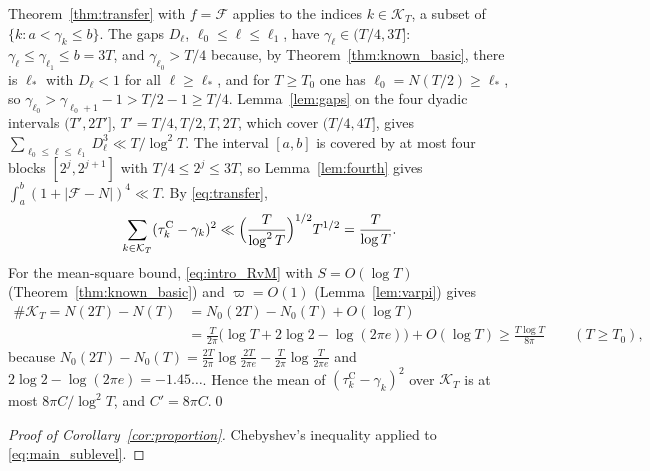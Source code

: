 \documentclass[11pt,a4paper]{article}
\makeatletter
\numberwithin{equation}{section}
\DeclareRobustCommand{\CGref}[1]{\ref{#1}}
\DeclareRobustCommand{\CGeqref}[1]{\eqref{#1}}
\let\CG@origref\ref
\let\CG@origeqref\eqref
\newcommand{\CG@gettip}[1]{\@ifundefined{CGTip@#1}{#1}{\csname CGTip@#1\endcsname}}
\DeclareRobustCommand{\CGref}[1]{\pdftooltip{\CG@origref{#1}}{\CG@gettip{#1}}}
\DeclareRobustCommand{\CGeqref}[1]{\pdftooltip{\CG@origeqref{#1}}{\CG@gettip{#1}}}
\theoremstyle{definition}
\theoremstyle{remark}
\newcommand{\Nz}{N_0} %
\newcommand{\Fc}{\mathcal F}
\newcommand{\Kc}{\mathcal K}
\makeatother
\begin{document}
Theorem~\CGref{thm:transfer} with $f=\Fc$ applies to the indices $k\in\Kc_T$, a subset of $\{k:a<\gamma_k\le b\}$. The gaps $D_\ell$, $\ell_0\le\ell\le\ell_1$, have $\gamma_\ell\in(T/4,3T]$: $\gamma_\ell\le\gamma_{\ell_1}\le b=3T$, and $\gamma_{\ell_0}>T/4$ because, by Theorem~\CGref{thm:known_basic}, there is $\ell_*$ with $D_\ell<1$ for all $\ell\ge\ell_*$, and for $T\ge T_0$ one has $\ell_0=N(T/2)\ge\ell_*$, so $\gamma_{\ell_0}>\gamma_{\ell_0+1}-1>T/2-1\ge T/4$. Lemma~\CGref{lem:gaps} on the four dyadic intervals $(T',2T']$, $T'=T/4,T/2,T,2T$, which cover $(T/4,4T]$, gives $\sum_{\ell_0\le\ell\le\ell_1}D_\ell^3\ll T/\log^2T$. The interval $[a,b]$ is covered by at most four blocks $[2^j,2^{j+1}]$ with $T/4\le2^j\le3T$, so Lemma~\CGref{lem:fourth} gives $\int_a^b(1+|\Fc-N|)^4\ll T$. By \CGeqref{eq:transfer},
\[
\sum_{k\in\Kc_T}(\tau_{k}^{\mathrm C}-\gamma_k)^2\ll\Bigl(\frac T{\log^2T}\Bigr)^{1/2}T^{1/2}=\frac T{\log T}.
\]
For the mean-square bound, \CGeqref{eq:intro_RvM} with $S=O(\log T)$ (Theorem~\CGref{thm:known_basic}) and $\varpi=O(1)$ (Lemma~\CGref{lem:varpi}) gives
\[
\begin{aligned}
\#\Kc_T=N(2T)-N(T)&=\Nz(2T)-\Nz(T)+O(\log T)\\
&=\frac T{2\pi}\bigl(\log T+2\log2-\log(2\pi e)\bigr)+O(\log T)\ge\frac{T\log T}{8\pi}\qquad(T\ge T_0),
\end{aligned}
\]
because $\Nz(2T)-\Nz(T)=\frac{2T}{2\pi}\log\frac{2T}{2\pi e}-\frac T{2\pi}\log\frac T{2\pi e}$ and $2\log2-\log(2\pi e)=-1.45\ldots$. Hence the mean of $(\tau_{k}^{\mathrm C}-\gamma_k)^2$ over $\Kc_T$ is at most $8\pi C/\log^2T$, and $C'=8\pi C$.\qed

\begin{proof}[Proof of Corollary~\ref{cor:proportion}]
Chebyshev's inequality applied to \CGeqref{eq:main_sublevel}.
\end{proof}
\end{document}

